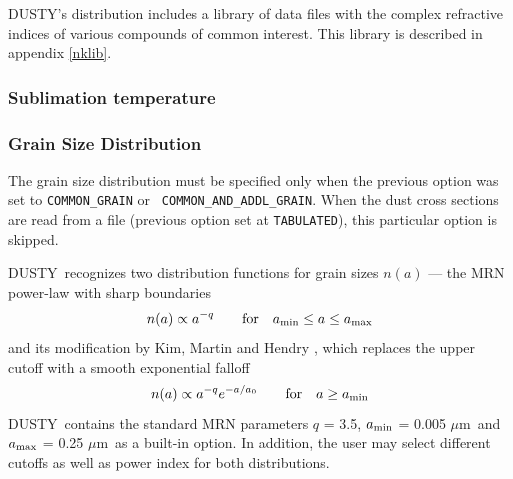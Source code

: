 \documentclass[11pt]{article}
\def\D    {{\sf DUSTY}}
\def\eq#1{\begin{equation} #1 \end{equation}}
\def\mic    {\hbox{$\mu$m}}
\begin{document}
\D's distribution includes a library of data files with the complex
refractive indices of various compounds of common interest. This
library is described in appendix \ref{nklib}.

\subsubsection{Sublimation temperature}
\label{sec:sub_temp}


\subsubsection{Grain Size Distribution}

The grain size distribution must be specified only when the previous
option was set to {\tt COMMON\_GRAIN} or {\tt
  COMMON\_AND\_ADDL\_GRAIN}.  When the dust cross sections are read
from a file (previous option set at {\tt TABULATED}), this particular
option is skipped.

\D\ recognizes two distribution functions for grain sizes $n(a)$ ---
the MRN \cite{MRN77} power-law with sharp boundaries \eq{ n(a) \propto
  a^{-q} \qquad \hbox{for} \quad a_{\rm min} \le a \le a_{\rm max} }
and its modification by Kim, Martin and Hendry \cite{KMH94}, which
replaces the upper cutoff with a smooth exponential falloff \eq{ n(a)
  \propto a^{-q} e^{-a/a_0} \qquad \hbox{for} \quad a \ge a_{\rm min}
} \D\ contains the standard MRN parameters $q$ = 3.5, $a_{\rm min}$ =
0.005 \mic\ and $a_{\rm max}$ = 0.25 \mic\ as a built-in option.  In
addition, the user may select different cutoffs as well as power index
for both distributions.
\end{document}
